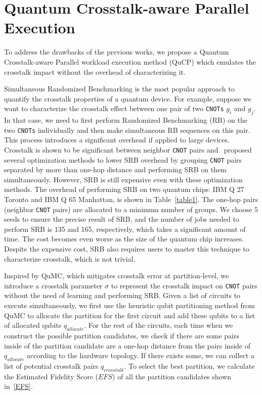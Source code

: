 \documentclass[conference]{IEEEtran}
\begin{document}
\section{Quantum Crosstalk-aware Parallel Execution}

To address the drawbacks of the previous works, we propose a Quantum Crosstalk-aware Parallel workload execution method (QuCP) which emulates the crosstalk impact without the overhead of characterizing it. 

Simultaneous Randomized Benchmarking is the most popular approach to quantify the crosstalk properties of a quantum device. For example, suppose we want to characterize the crosstalk effect between one pair of two \texttt{CNOTs} $g_i$ and $g_j$. In that case, we need to first perform Randomized Benchmarking (RB) on the two \texttt{CNOTs} individually and then make simultaneous RB sequences on this pair. This process introduces a significant overhead if applied to large devices. Crosstalk is shown to be significant between neighbor \texttt{CNOT} pairs and~\cite{murali2020software} proposed several optimization methods to lower SRB overhead by grouping \texttt{CNOT} pairs separated by more than one-hop distance and performing SRB on them simultaneously. However, SRB is still expensive even with these optimization methods. The overhead of performing SRB on two quantum chips: IBM Q 27 Toronto and IBM Q 65 Manhattan, is shown in Table~\ref{table1}. The one-hop pairs (neighbor \texttt{CNOT} pairs) are allocated to a minimum number of groups. We choose 5 seeds to ensure the precise result of SRB, and the number of jobs needed to perform SRB is 135 and 165, respectively, which takes a significant amount of time. The cost becomes even worse as the size of the quantum chip increases. Despite the expensive cost, SRB also requires users to master this technique to characterize crosstalk, which is not trivial. 

Inspired by QuMC, which mitigates crosstalk error at partition-level, we introduce a crosstalk parameter $\sigma$ to represent the crosstalk impact on \texttt{CNOT} pairs without the need of learning and performing SRB. Given a list of circuits to execute simultaneously, we first use the heuristic qubit partitioning method from QuMC to allocate the partition for the first circuit and add these qubits to a list of allocated qubits $q_{allocate}$. For the rest of the circuits, each time when we construct the possible partition candidates, we check if there are some pairs inside of the partition candidate are a one-hop distance from the pairs inside of $q_{allocate}$ according to the hardware topology. If there exists some, we can collect a list of potential crosstalk pairs $q_{crosstalk}$. To select the best partition, we calculate the Estimated Fidelity Score ($EFS$) of all the partition candidates shown in~\eqref{EFS}. 
\end{document}
